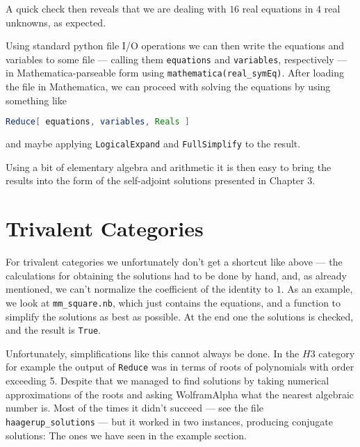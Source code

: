 

A quick check then reveals that we are dealing with $16$ real equations in $4$ real unknowns, as expected.

\bigno
Using standard python file I/O operations we can then write the equations and variables to some file --- calling them \texttt{equations} and \texttt{variables}, respectively --- in Mathematica-parseable form using \texttt{mathematica(real\_symEq)}. After loading the file in Mathematica, we can proceed with solving the equations by using something like
\begin{lstlisting}[language=Mathematica]
Reduce[ equations, variables, Reals ]
\end{lstlisting} 
and maybe applying \texttt{LogicalExpand} and \texttt{FullSimplify} to the result.

Using a bit of elementary algebra and arithmetic it is then easy to bring the results into the form of the self-adjoint solutions presented in \textsf{Chapter 3}.

\section*{Trivalent Categories}
For trivalent categories we unfortunately don't get a shortcut like above --- the calculations for obtaining the solutions had to be done by hand, and, as already mentioned, we can't normalize the coefficient of the identity to $1$. As an example, we look at \texttt{mm\_square.nb}, which just contains the equations, and a function to simplify the solutions as best as possible. At the end one the solutions is checked, and the result is \texttt{True}.



\bigno Unfortunately, simplifications like this cannot always be done. In the $H3$ category for example the output of \texttt{Reduce} was in terms of roots of polynomials with order exceeding 5. Despite that we managed to find solutions by taking numerical approximations of the roots and asking WolframAlpha what the nearest algebraic number is. Most of the times it didn't succeed --- see the file \texttt{haagerup\_solutions} --- but it worked in two instances, producing conjugate solutions: The ones we have seen in the example section.